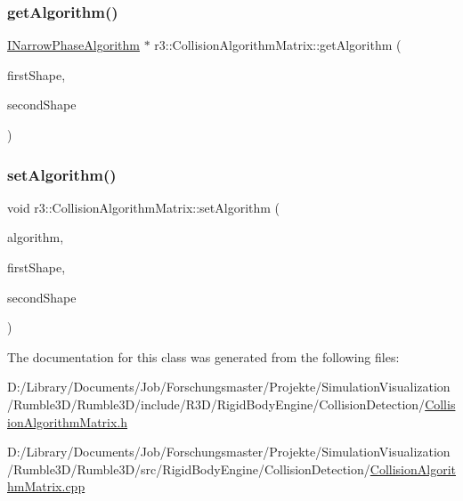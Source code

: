 \subsubsection{\texorpdfstring{get\+Algorithm()}{getAlgorithm()}}
{\footnotesize\ttfamily \mbox{\hyperlink{classr3_1_1_i_narrow_phase_algorithm}{I\+Narrow\+Phase\+Algorithm}} $\ast$ r3\+::\+Collision\+Algorithm\+Matrix\+::get\+Algorithm (\begin{DoxyParamCaption}\item[{Collision\+Primitive\+Type}]{first\+Shape,  }\item[{Collision\+Primitive\+Type}]{second\+Shape }\end{DoxyParamCaption})}

\mbox{\label{classr3_1_1_collision_algorithm_matrix_a6ddf117fbce8a3216b4b4413ccade6d0}} 
\subsubsection{\texorpdfstring{set\+Algorithm()}{setAlgorithm()}}
{\footnotesize\ttfamily void r3\+::\+Collision\+Algorithm\+Matrix\+::set\+Algorithm (\begin{DoxyParamCaption}\item[{\mbox{\hyperlink{classr3_1_1_i_narrow_phase_algorithm}{I\+Narrow\+Phase\+Algorithm}} $\ast$}]{algorithm,  }\item[{Collision\+Primitive\+Type}]{first\+Shape,  }\item[{Collision\+Primitive\+Type}]{second\+Shape }\end{DoxyParamCaption})}



The documentation for this class was generated from the following files\+:\begin{DoxyCompactItemize}
\item 
D\+:/\+Library/\+Documents/\+Job/\+Forschungsmaster/\+Projekte/\+Simulation\+Visualization/\+Rumble3\+D/\+Rumble3\+D/include/\+R3\+D/\+Rigid\+Body\+Engine/\+Collision\+Detection/\mbox{\hyperlink{_collision_algorithm_matrix_8h}{Collision\+Algorithm\+Matrix.\+h}}\item 
D\+:/\+Library/\+Documents/\+Job/\+Forschungsmaster/\+Projekte/\+Simulation\+Visualization/\+Rumble3\+D/\+Rumble3\+D/src/\+Rigid\+Body\+Engine/\+Collision\+Detection/\mbox{\hyperlink{_collision_algorithm_matrix_8cpp}{Collision\+Algorithm\+Matrix.\+cpp}}\end{DoxyCompactItemize}
